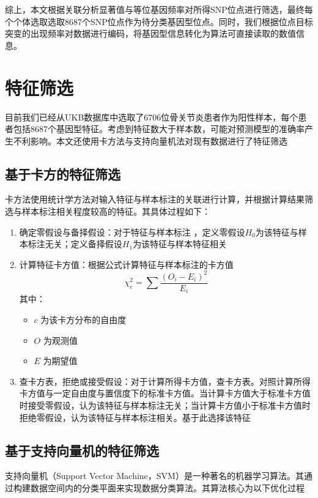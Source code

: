 综上，本文根据关联分析显著值与等位基因频率对所得SNP位点进行筛选，最终每个个体选取选取8687个SNP位点作为待分类基因型位点。同时，我们根据位点目标突变的出现频率对数据进行编码，将基因型信息转化为算法可直接读取的数值信息。

\section{特征筛选}
目前我们已经从UKB数据库中选取了6706位骨关节炎患者作为阳性样本，每个患者包括8687个基因型特征。考虑到特征数大于样本数，可能对预测模型的准确率产生不利影响。\cite{janes_optimal_2005}本文还使用卡方法与支持向量机法对现有数据进行了特征筛选
\subsection{基于卡方的特征筛选}

卡方法使用统计学方法对输入特征与样本标注的关联进行计算，并根据计算结果筛选与样本标注相关程度较高的特征。其具体过程如下：

\begin{enumerate}
\item
  确定零假设与备择假设：对于特征与样本标注
  ，定义零假设$H_0$为该特征与样本标注无关；定义备择假设$H_1$为该特征与样本特征相关
\item
  计算特征卡方值：根据公式计算特征与样本标注的卡方值
    \begin{equation}
        \chi_c^2=\sum \frac{(O_{i}-E_i)^2}{E_i}
    \end{equation}
  其中：

  \begin{itemize}
  \item
    \(c\) 为该卡方分布的自由度
  \item
    \(O\) 为观测值
  \item
    \(E\) 为期望值
  \end{itemize}
\item
  查卡方表，拒绝或接受假设：对于计算所得卡方值，查卡方表。对照计算所得卡方值与一定自由度与置信度下的标准卡方值。当计算卡方值大于标准卡方值时接受零假设，认为该特征与样本标注无关；当计算卡方值小于标准卡方值时拒绝零假设，认为该特征与样本标注相关。基于此选择该特征
\end{enumerate}
\subsection{ 基于支持向量机的特征筛选}

支持向量机（Support Vector Machine，SVM）是一种著名的机器学习算法。其通过构建数据空间内的分类平面来实现数据分类算法。其算法核心为以下优化过程

